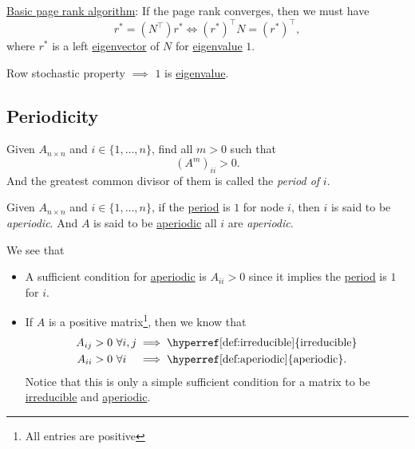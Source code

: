 \begin{prev}
	\hyperref[algo:basic-page-rank-algorithm]{Basic page rank algorithm}: If the page rank converges,
	then we must have
	\[
		r^{\ast} = (N^{\top})r^{\ast} \iff (r^{\ast})^{\top} N = (r^{\ast})^{\top},
	\]
	where \(r^{\ast}\) is a left \hyperref[def:eigenvector]{eigenvector} of \(N\) for \hyperref[def:eigenvalue]{eigenvalue} \(1\).
\end{prev}
\begin{remark}
	Row stochastic property \(\implies\) \(1\) is \hyperref[def:eigenvalue]{eigenvalue}.
\end{remark}

\subsection{Periodicity}
\begin{definition}[Period]\label{def:period}
	Given \(A_{n\times n}\) and \(i\in\{1, \dots , n\}\), find all \(m>0\) such that
	\[
		(A^m)_{ii}>0.
	\]
	And the greatest common divisor of them is called the \emph{period of} \(i\).
\end{definition}

\begin{definition}[Aperiodic]\label{def:aperiodic}
	Given \(A_{n\times n}\) and \(i\in\{1, \dots , n\}\), if the \hyperref[def:period]{period} is \(1\) for node \(i\), then \(i\) is said to be \emph{aperiodic}. And \(A\) is said to be \hyperref[def:aperiodic]{aperiodic} all \(i\) are \emph{aperiodic}.
\end{definition}

\begin{remark}\label{rmk:lec11-1}
	We see that
	\begin{itemize}
		\item A sufficient condition for \hyperref[def:aperiodic]{aperiodic} is \(A_{ii} > 0 \) since it implies the \hyperref[def:period]{period} is \(1\) for \(i\).
		\item If \(A\) is a positive matrix\footnote{All entries are positive}, then we know that
		      \[
			      \begin{alignedat}{3}
				      A_{ij}>0\ &\forall i, j &&\implies \text{\hyperref[def:irreducible]{irreducible}}\\
				      A_{ii}>0\ &\forall i &&\implies \text{\hyperref[def:aperiodic]{aperiodic}}.
			      \end{alignedat}
		      \]
		      Notice that this is only a simple sufficient condition for a matrix to be \hyperref[def:irreducible]{irreducible} and \hyperref[def:aperiodic]{aperiodic}.
	\end{itemize}
\end{remark}

